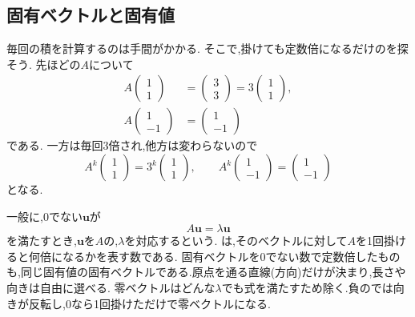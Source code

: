 \subsection{固有ベクトルと固有値}

毎回の積を計算するのは手間がかかる.
そこで,掛けても定数倍になるだけのを探そう.
先ほどの$A$について
\[
  \begin{aligned}
    A\begin{pmatrix}1\\1\end{pmatrix}
    &=\begin{pmatrix}3\\3\end{pmatrix}
    =3\begin{pmatrix}1\\1\end{pmatrix},\\
    A\begin{pmatrix}1\\-1\end{pmatrix}
    &=\begin{pmatrix}1\\-1\end{pmatrix}
  \end{aligned}
\]
である.
一方は毎回$3$倍され,他方は変わらないので
\[
  A^k\begin{pmatrix}1\\1\end{pmatrix}
  =3^k\begin{pmatrix}1\\1\end{pmatrix},
  \qquad
  A^k\begin{pmatrix}1\\-1\end{pmatrix}
  =\begin{pmatrix}1\\-1\end{pmatrix}
\]
となる.

一般に,0でない$\boldsymbol{u}$が
\[
  A\boldsymbol{u}=\lambda\boldsymbol{u}
\]
を満たすとき,$\boldsymbol{u}$を$A$の\textbf{},$\lambda$を対応する\textbf{}という.
は,そのベクトルに対して$A$を1回掛けると何倍になるかを表す数である.
固有ベクトルを0でない数で定数倍したものも,同じ固有値の固有ベクトルである.原点を通る直線(方向)だけが決まり,長さや向きは自由に選べる.
零ベクトルはどんな$\lambda$でも式を満たすため除く.負のでは向きが反転し,$0$なら1回掛けただけで零ベクトルになる.

